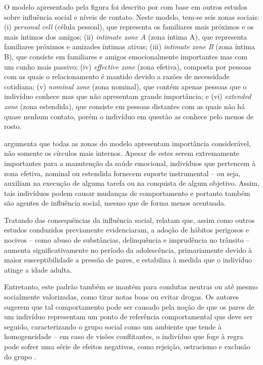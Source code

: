 O modelo apresentado pela figura foi descrito por  com base em outros estudos sobre influência social e níveis de contato. Neste modelo, tem-se seis zonas sociais: (i) \textit{personal cell} (célula pessoal), que representa os familiares mais próximos e os mais íntimos dos amigos; (ii) \textit{intimate zone A} (zona íntima A), que representa familiares próximos e amizades íntimas ativas; (iii) \textit{intimate zone B} (zona íntima B), que consiste em familiares e amigos emocionalmente importantes mas com um cunho mais passivo; (iv) \textit{effective zone} (zona efetiva), composta por pessoas com as quais o relacionamento é mantido devido a razões de necessidade cotidiana; (v) \textit{nominal zone} (zona nominal), que contém apenas pessoas que o indivíduo conhece mas que não apresentam grande importância; e (vi) \textit{extended zone} (zona estendida), que consiste em pessoas distantes com as quais não há quase nenhum contato, porém o indivíduo em questão as conhece pelo menos de rosto.

 argumenta que todas as zonas do modelo apresentam importância considerável, não somente os círculos mais internos. Apesar de estes serem extremamente importantes para a manutenção da saúde emocional, indivíduos que pertencem à zona efetiva, nominal ou estendida fornecem suporte instrumental -- ou seja, auxiliam na execução de alguma tarefa ou na conquista de algum objetivo. Assim, tais indivíduos podem causar mudanças de comportamento e portanto também são agentes de influência social, mesmo que de forma menos acentuada.

Tratando das consequências da influência social,  relatam que, assim como outros estudos conduzidos previamente evidenciaram, a adoção de hábitos perigosos e nocivos -- como abuso de substâncias, delinquência e imprudência no trânsito -- aumenta significativamente no período da adolescência, primariamente devido à maior susceptibilidade a pressão de pares, e estabiliza à medida que o indivíduo atinge a idade adulta.

Entretanto, este padrão também se mantém para condutas neutras ou até mesmo socialmente valorizadas, como tirar notas boas ou evitar drogas. Os autores sugerem que tal comportamento pode ser causado pela noção de que os pares de um indivíduo representam um ponto de referência comportamental que deve ser seguido, caracterizando o grupo social como um ambiente que tende à homogeneidade -- em caso de visões conflitantes, o indivíduo que foge à regra pode sofrer uma série de efeitos negativos, como rejeição, ostracismo e exclusão do grupo \cite{Steinberg2007,Gremmen2017}.

